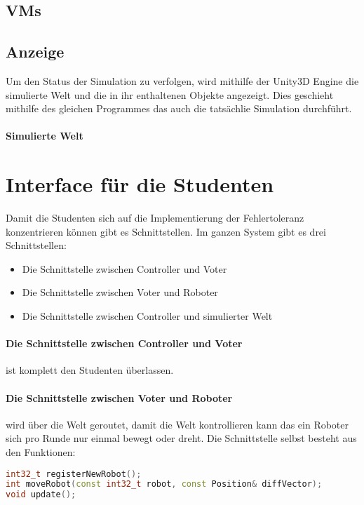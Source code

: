 ﻿\documentclass[
    12pt,
    bibliography=totoc,
    ngerman
]{scrartcl}
\begin{document}
\subsection{VMs}

\subsection{Anzeige}
Um den Status der Simulation zu verfolgen, wird mithilfe der Unity3D Engine die simulierte Welt und die in ihr enthaltenen Objekte angezeigt. Dies geschieht mithilfe des gleichen Programmes das auch
die tats{\"{a}}chlie Simulation durchf{\"{u}}hrt.

\paragraph{Simulierte Welt}

\clearpage
\section{Interface f{\"{u}}r die Studenten}\label{interface}
Damit die Studenten sich auf die Implementierung der Fehlertoleranz konzentrieren k{\"{o}}nnen gibt es Schnittstellen.
Im ganzen System gibt es drei Schnittstellen:
\begin{itemize}
\item Die Schnittstelle zwischen Controller und Voter
\item Die Schnittstelle zwischen Voter und Roboter
\item Die Schnittstelle zwischen Controller und simulierter Welt 
\end{itemize}

\paragraph{Die Schnittstelle zwischen Controller und Voter} ist komplett den Studenten {\"{u}}berlassen.

\paragraph{Die Schnittstelle zwischen Voter und Roboter} wird {\"{u}}ber die Welt geroutet, damit die Welt kontrollieren kann das ein
Roboter sich pro Runde nur einmal bewegt oder dreht. Die Schnittstelle selbst besteht aus den Funktionen:
\begin{lstlisting}[frame=single, language=c++] 
int32_t registerNewRobot();
int moveRobot(const int32_t robot, const Position& diffVector);
void update();
\end{lstlisting}
\end{document}
